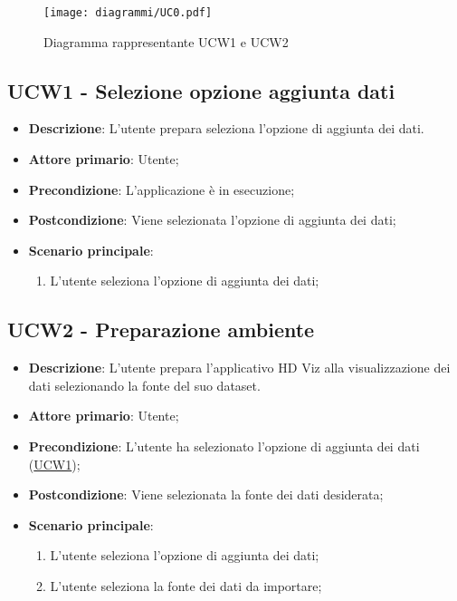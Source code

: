 \begin{figure}[h]
    \centering
    \texttt{[image: diagrammi/UC0.pdf]}
    \caption{Diagramma rappresentante UCW1 e UCW2}
    \label{fig:UCW0}
\end{figure}

\subsection{UCW1 - Selezione opzione aggiunta dati}
\label{sub:ucw1}

\begin{itemize}
    \item \textbf{Descrizione}: L'utente prepara seleziona l'opzione di aggiunta dei dati.

    \item \textbf{Attore primario}: Utente;

    \item \textbf{Precondizione}:   L'applicazione è in esecuzione;

    \item \textbf{Postcondizione}:  Viene selezionata l'opzione di aggiunta dei dati;

    \item \textbf{Scenario principale}:
          \begin{enumerate}
              \item L'utente seleziona l'opzione di aggiunta dei dati;
          \end{enumerate}

\end{itemize}

\subsection{UCW2 - Preparazione ambiente}
\label{sub:ucw2}

\begin{itemize}
    \item \textbf{Descrizione}: L'utente prepara l'applicativo HD Viz alla visualizzazione dei dati selezionando la fonte del suo dataset.

    \item \textbf{Attore primario}: Utente;

    \item \textbf{Precondizione}:   L'utente ha selezionato l'opzione di aggiunta dei dati (\hyperref[sub:ucw1]{UCW1});

    \item \textbf{Postcondizione}:  Viene selezionata la fonte dei dati desiderata;

    \item \textbf{Scenario principale}:
          \begin{enumerate}
              \item L'utente seleziona l'opzione di aggiunta dei dati;
              \item L'utente seleziona la fonte dei dati da importare;
          \end{enumerate}

\end{itemize}

